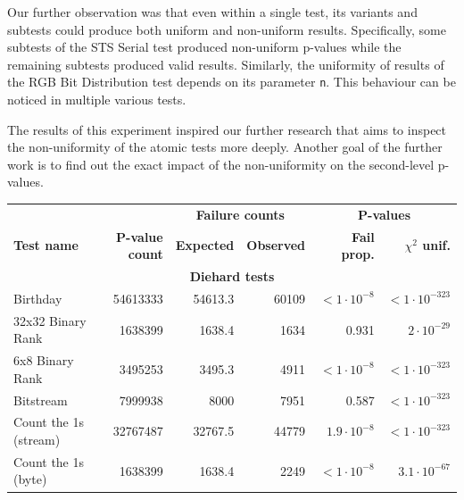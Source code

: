 \documentclass[
	digital,    %
	oneside,    %
	color,
	11pt,
	nocover,
	notable,
	nolof,
	nolot,
]{fithesis3}
\newcommand{\rd}{\cellcolor{red!40}}
\theoremstyle{definition}
\theoremstyle{remark}
\begin{document}
Our further observation was that even within a single test, its variants and subtests could produce both uniform and non-uniform results. Specifically, some subtests of the STS Serial test produced non-uniform p-values while the remaining subtests produced valid results. Similarly, the uniformity of results of the RGB Bit Distribution test depends on its parameter \texttt{n}. This behaviour can be noticed in multiple various tests.

The results of this experiment inspired our further research that aims to inspect the non-uniformity of the atomic tests more deeply. Another goal of the further work is to find out the exact impact of the non-uniformity on the second-level p-values.

\newpage

\begin{table}[H]
\begin{nomar}
\centering
\scalebox{.85}
{
\begin{tabular}{@{}lrrrrr@{}} \toprule
                               &                   & \multicolumn{2}{c}{\textbf{Failure counts}} & \multicolumn{2}{c}{\textbf{P-values}} \\ \cmidrule(lr){3-4} \cmidrule(lr){5-6}
\textbf{Test name}             & \textbf{P-value count}     & \textbf{Expected}      & \textbf{Observed}      & \textbf{Fail prop.}        & \textbf{$\chi^2$ unif.}      \\ \midrule
\multicolumn{6}{c}{\textbf{Diehard tests}} \\ \midrule
Birthday                       & 54613333          & 54613.3       & 60109         & $<1\cdot 10^{-8}$  \rd & $<1\cdot 10^{-323}$   \rd \\
32x32 Binary Rank              & 1638399           & 1638.4        & 1634          & 0.931                  & $2 \cdot 10^{-29}$    \rd \\
6x8 Binary Rank                & 3495253           & 3495.3        & 4911          & $<1\cdot 10^{-8}$  \rd & $<1\cdot 10^{-323}$   \rd \\
Bitstream                      & 7999938           & 8000          & 7951          & 0.587                  & $<1\cdot 10^{-323}$   \rd \\
Count the 1s (stream)          & 32767487          & 32767.5       & 44779         & $1.9\cdot 10^{-8}$ \rd & $<1\cdot 10^{-323}$   \rd \\
Count the 1s (byte)            & 1638399           & 1638.4        & 2249          & $<1\cdot 10^{-8}$  \rd & $3.1 \cdot 10^{-67}$  \rd \\

\end{tabular}}
\end{nomar}
\end{table}
\end{document}
